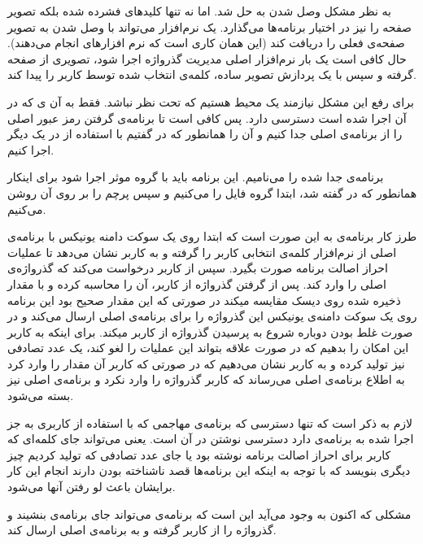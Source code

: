 به نظر مشکل وصل شدن  به  حل شد. اما  نه تنها کلید‌های فشرده شده بلکه تصویر صفحه را نیز در اختیار برنامه‌ها می‌گذارد. یک نرم‌افزار می‌تواند با وصل شدن به  تصویر صفحه‌ی فعلی را دریافت کند (این همان کاری است که نرم افزارهای  انجام می‌دهند). حال کافی است یک بار نرم‌افزار اصلی مدیریت گذرواژه اجرا شود،  تصویری از صفحه گرفته و سپس با یک پردازش تصویر ساده، کلمه‌ی انتخاب شده توسط کاربر را پیدا کند.

برای رفع این مشکل نیازمند یک محیط هستیم که تحت نظر  نباشد.  فقط به آن ی که در آن اجرا شده است دسترسی دارد. پس کافی است تا برنامه‌ی گرفتن رمز عبور اصلی را از برنامه‌ی اصلی جدا کنیم و آن را همانطور که در  گفتیم با استفاده از  در یک  دیگر اجرا کنیم. 

برنامه‌ی جدا شده را  می‌نامیم. این برنامه باید با گروه موثر  اجرا شود برای اینکار همانطور که در  گفته شد، ابتدا گروه فایل را  می‌کنیم و سپس پرچم  را بر روی آن روشن می‌کنیم.

طرز کار برنامه‌ی  به این صورت است که ابتدا روی یک سوکت دامنه یونیکس با برنامه‌ی اصلی از نرم‌افزار  کلمه‌ی انتخابی کاربر را گرفته و به کاربر نشان می‌دهد تا عملیات احراز اصالت برنامه صورت بگیرد. سپس از کاربر درخواست می‌کند که گذرواژه‌ی اصلی را وارد کند. پس از گرفتن گذرواژه از کاربر،  آن را محاسبه کرده و با مقدار ذخیره شده روی دیسک مقایسه میکند در صورتی که این مقدار صحیح بود این برنامه روی یک سوکت دامنه‌ی یونیکس این گذرواژه را برای برنامه‌ی اصلی ارسال می‌کند و در صورت غلط بودن دوباره شروع به پرسیدن گذرواژه از کاربر میکند. برای اینکه به کاربر این امکان را بدهیم که در صورت علاقه بتواند این عملیات را لغو کند، یک عدد تصادفی نیز تولید کرده و به کاربر نشان می‌دهیم که در صورتی که کاربر آن مقدار را وارد کرد  به اطلاع برنامه‌ی اصلی می‌رساند که کاربر گذرواژه را وارد نکرد و برنامه‌ی اصلی نیز بسته می‌شود.

لازم به ذکر است که تنها دسترسی که برنامه‌ی مهاجمی که با استفاده از کاربری به جز  اجرا شده به  برنامه‌ی  دارد دسترسی نوشتن در آن است. یعنی می‌تواند جای کلمه‌ای که کاربر برای احراز اصالت برنامه نوشته بود یا جای عدد تصادفی که تولید کردیم چیز دیگری بنویسد که با توجه به اینکه این برنامه‌ها قصد ناشناخته بودن دارند انجام این کار برایشان باعث لو رفتن آنها می‌شود.

مشکلی که اکنون به وجود می‌آید این است که برنامه‌ی  می‌تواند جای برنامه‌ی  بنشیند و گذرواژه را از کاربر گرفته و به برنامه‌ی اصلی ارسال کند. 

